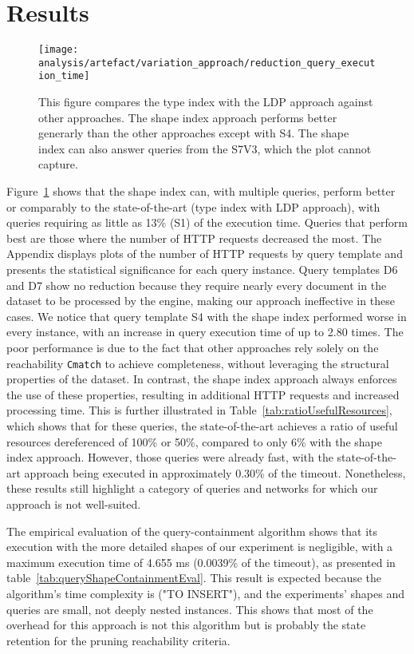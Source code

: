 \section{Results}

\begin{figure}[h]
    \centering
    \texttt{[image: analysis/artefact/variation\_approach/reduction\_query\_execution\_time]}
    \caption{
        This figure compares the type index with the LDP approach against other approaches.
        The shape index approach performs better generarly than the other approaches except with S4.
        The shape index can also answer queries from the S7V3, which the plot cannot capture.
    }
    \label{fig:compApproach}
\end{figure}


Figure~\ref{fig:compApproach} shows that the shape index can, with multiple queries, perform better or comparably to the state-of-the-art (type index with LDP approach), with queries requiring as little as 13\% (S1) of the execution time.
Queries that perform best are those where the number of HTTP requests decreased the most.
The Appendix displays plots of the number of HTTP requests by query template and presents the statistical significance for each query instance.
Query templates D6 and D7 show no reduction because they require nearly every document in the dataset to be processed by the engine, making our approach ineffective in these cases.
We notice that query template S4 with the shape index performed worse in every instance, with an increase in query execution time of up to 2.80 times.
The poor performance is due to the fact that other approaches rely solely on the reachability \texttt{Cmatch} to achieve completeness, without leveraging the structural properties of the dataset. 
In contrast, the shape index approach always enforces the use of these properties, resulting in additional HTTP requests and increased processing time.
This is further illustrated in Table~\ref{tab:ratioUsefulResources}, which shows that for these queries, the state-of-the-art achieves a ratio of useful resources dereferenced of 100\% or 50\%, compared to only 6\% with the shape index approach.
However, those queries were already fast, with the state-of-the-art approach being executed in approximately 0.30\% of the timeout.
Nonetheless, these results still highlight a category of queries and networks for which our approach is not well-suited.

The empirical evaluation of the query-containment algorithm shows that its execution with the more detailed shapes of our experiment is negligible, with a maximum execution time of 4.655 ms (0.0039\% of the timeout), as presented in table~\ref{tab:queryShapeContainmentEval}.
This result is expected because the algorithm's time complexity is ("TO INSERT"), and the experiments' shapes and queries are small, not deeply nested instances.
This shows that most of the overhead for this approach is not this algorithm but is probably the state retention for the pruning reachability criteria.

